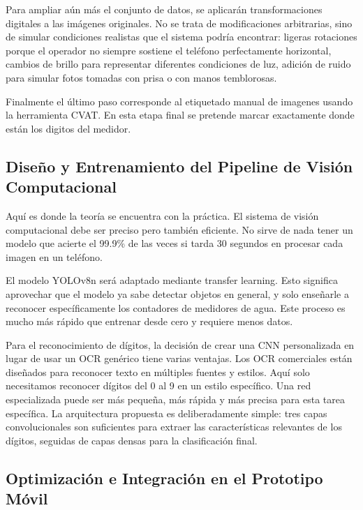 Para ampliar aún más el conjunto de datos, se aplicarán transformaciones digitales a las imágenes originales. No se trata de modificaciones arbitrarias, sino de simular condiciones realistas que el sistema podría encontrar: ligeras rotaciones porque el operador no siempre sostiene el teléfono perfectamente horizontal, cambios de brillo para representar diferentes condiciones de luz, adición de ruido para simular fotos tomadas con prisa o con manos temblorosas.

Finalmente el último paso corresponde al etiquetado manual de imagenes usando la herramienta CVAT. En esta etapa final se pretende marcar exactamente donde están los digitos del medidor.

\subsection{Diseño y Entrenamiento del Pipeline de Visión Computacional}
\label{ssec:pipeline_design}

Aquí es donde la teoría se encuentra con la práctica. El sistema de visión computacional debe ser preciso pero también eficiente. No sirve de nada tener un modelo que acierte el 99.9\% de las veces si tarda 30 segundos en procesar cada imagen en un teléfono.

El modelo YOLOv8n será adaptado mediante transfer learning. Esto significa aprovechar que el modelo ya sabe detectar objetos en general, y solo enseñarle a reconocer específicamente los contadores de medidores de agua. Este proceso es mucho más rápido que entrenar desde cero y requiere menos datos.

Para el reconocimiento de dígitos, la decisión de crear una CNN personalizada en lugar de usar un OCR genérico tiene varias ventajas. Los OCR comerciales están diseñados para reconocer texto en múltiples fuentes y estilos. Aquí solo necesitamos reconocer dígitos del 0 al 9 en un estilo específico. Una red especializada puede ser más pequeña, más rápida y más precisa para esta tarea específica. La arquitectura propuesta es deliberadamente simple: tres capas convolucionales son suficientes para extraer las características relevantes de los dígitos, seguidas de capas densas para la clasificación final.

\subsection{Optimización e Integración en el Prototipo Móvil}
\label{ssec:optimization_integration}

